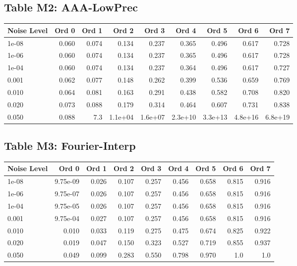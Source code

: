 \clearpage

\subsection*{Table M2: AAA-LowPrec}

\begin{longtable}{lrrrrrrrr}
\toprule
\textbf{Noise Level} & \textbf{Ord 0} & \textbf{Ord 1} & \textbf{Ord 2} & \textbf{Ord 3} & \textbf{Ord 4} & \textbf{Ord 5} & \textbf{Ord 6} & \textbf{Ord 7} \\
\midrule
\endhead
1e-08 & 0.060 & 0.074 & 0.134 & 0.237 & 0.365 & 0.496 & 0.617 & 0.728 \\
1e-06 & 0.060 & 0.074 & 0.134 & 0.237 & 0.365 & 0.496 & 0.617 & 0.728 \\
1e-04 & 0.060 & 0.074 & 0.134 & 0.237 & 0.364 & 0.496 & 0.617 & 0.727 \\
0.001 & 0.062 & 0.077 & 0.148 & 0.262 & 0.399 & 0.536 & 0.659 & 0.769 \\
0.010 & 0.064 & 0.081 & 0.163 & 0.291 & 0.438 & 0.582 & 0.708 & 0.820 \\
0.020 & 0.073 & 0.088 & 0.179 & 0.314 & 0.464 & 0.607 & 0.731 & 0.838 \\
0.050 & 0.088 & 7.3 & 1.1e+04 & 1.6e+07 & 2.3e+10 & 3.3e+13 & 4.8e+16 & 6.8e+19 \\
\bottomrule
\end{longtable}

\clearpage

\subsection*{Table M3: Fourier-Interp}

\begin{longtable}{lrrrrrrrr}
\toprule
\textbf{Noise Level} & \textbf{Ord 0} & \textbf{Ord 1} & \textbf{Ord 2} & \textbf{Ord 3} & \textbf{Ord 4} & \textbf{Ord 5} & \textbf{Ord 6} & \textbf{Ord 7} \\
\midrule
\endhead
1e-08 & 9.75e-09 & 0.026 & 0.107 & 0.257 & 0.456 & 0.658 & 0.815 & 0.916 \\
1e-06 & 9.75e-07 & 0.026 & 0.107 & 0.257 & 0.456 & 0.658 & 0.815 & 0.916 \\
1e-04 & 9.75e-05 & 0.026 & 0.107 & 0.257 & 0.456 & 0.658 & 0.815 & 0.916 \\
0.001 & 9.75e-04 & 0.027 & 0.107 & 0.257 & 0.456 & 0.658 & 0.815 & 0.916 \\
0.010 & 0.010 & 0.033 & 0.119 & 0.275 & 0.475 & 0.674 & 0.825 & 0.922 \\
0.020 & 0.019 & 0.047 & 0.150 & 0.323 & 0.527 & 0.719 & 0.855 & 0.937 \\
0.050 & 0.049 & 0.099 & 0.283 & 0.550 & 0.798 & 0.970 & 1.0 & 1.0 \\
\bottomrule
\end{longtable}

